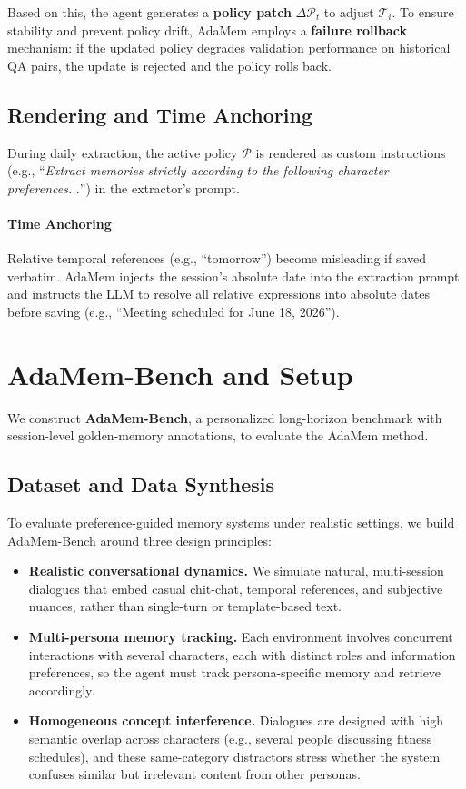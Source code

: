 \documentclass[11pt]{article}
\begin{document}
Based on this, the agent generates a \textbf{policy patch} $\Delta \mathcal{P}_t$ to adjust $\mathcal{T}_i$. To ensure stability and prevent policy drift, AdaMem employs a \textbf{failure rollback} mechanism: if the updated policy degrades validation performance on historical QA pairs, the update is rejected and the policy rolls back.

\subsection{Rendering and Time Anchoring}
During daily extraction, the active policy $\mathcal{P}$ is rendered as custom instructions (e.g., ``\textit{Extract memories strictly according to the following character preferences...}'') in the extractor's prompt.

\paragraph{Time Anchoring}
Relative temporal references (e.g., ``tomorrow'') become misleading if saved verbatim. AdaMem injects the session's absolute date into the extraction prompt and instructs the LLM to resolve all relative expressions into absolute dates before saving (e.g., ``Meeting scheduled for June 18, 2026'').

\section{AdaMem-Bench and Setup}
We construct \textbf{AdaMem-Bench}, a personalized long-horizon benchmark with session-level golden-memory annotations, to evaluate the AdaMem method.

\subsection{Dataset and Data Synthesis}
To evaluate preference-guided memory systems under realistic settings, we build AdaMem-Bench around three design principles:
\begin{itemize}
    \item \textbf{Realistic conversational dynamics.} We simulate natural, multi-session dialogues that embed casual chit-chat, temporal references, and subjective nuances, rather than single-turn or template-based text.
    \item \textbf{Multi-persona memory tracking.} Each environment involves concurrent interactions with several characters, each with distinct roles and information preferences, so the agent must track persona-specific memory and retrieve accordingly.
    \item \textbf{Homogeneous concept interference.} Dialogues are designed with high semantic overlap across characters (e.g., several people discussing fitness schedules), and these same-category distractors stress whether the system confuses similar but irrelevant content from other personas.
\end{itemize}
\end{document}
